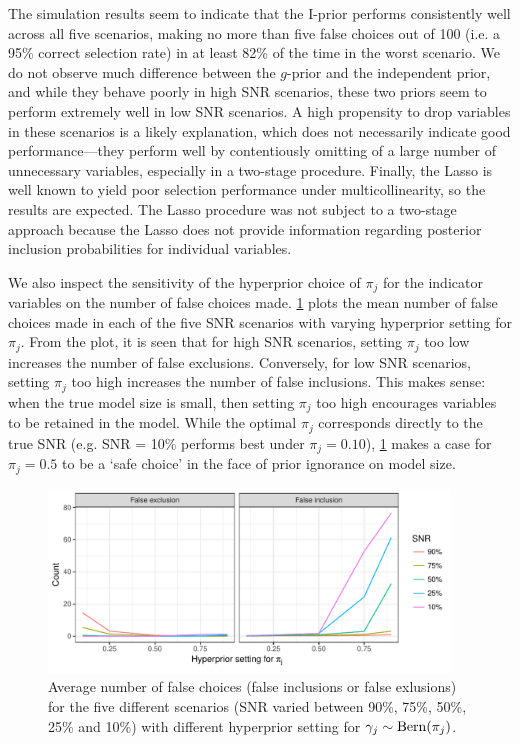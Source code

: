 \documentclass[showframe,11pt,twoside,openright]{report}
\begin{document}
The simulation results seem to indicate that the I-prior performs consistently well across all five scenarios, making no more than five false choices out of 100 (i.e. a 95\% correct selection rate) in at least 82\% of the time in the worst scenario.
We do not observe much difference between the $g$-prior and the independent prior, and while they behave poorly in high SNR scenarios, these two priors seem to perform extremely well in low SNR scenarios.
A high propensity to drop variables in these scenarios is a likely explanation, which does not necessarily indicate good performance---they perform well by contentiously omitting of a large number of unnecessary variables, especially in a two-stage procedure.
Finally, the Lasso is well known to yield poor selection performance under multicollinearity, so the results are expected.
The Lasso procedure was not subject to a two-stage approach because the Lasso does not provide information regarding posterior inclusion probabilities for individual variables.

We also inspect the sensitivity of the hyperprior choice of $\pi_j$ for the indicator variables on the number of false choices made.
\cref{fig:simres2} plots the mean number of false choices made in each of the five SNR scenarios with varying hyperprior setting for $\pi_j$.
From the plot, it is seen that for high SNR scenarios, setting $\pi_j$ too low increases the number of false exclusions.
Conversely, for low SNR scenarios, setting $\pi_j$ too high increases the number of false inclusions.
This makes sense: when the true model size is small, then setting $\pi_j$ too high encourages variables to be retained in the model.
While the optimal $\pi_j$ corresponds directly to the true SNR (e.g. SNR = 10\% performs best under $\pi_j=0.10$), \cref{fig:simres2} makes a case for $\pi_j=0.5$ to be a `safe choice' in the face of prior ignorance on model size.

\begin{figure}[hbt]
  \centering
  \includegraphics[width=0.95\textwidth]{figure/06-sens_analysis}
  \caption[Sensitivity analysis of hyperprior choice on number of false choices]{Average number of false choices (false inclusions or false exlusions) for the five different scenarios (SNR varied between 90\%, 75\%, 50\%, 25\% and 10\%) with different hyperprior setting for $\gamma_j\sim\operatorname{Bern}(\pi_j)$.}
  \label{fig:simres2}
\end{figure}
\vspace{-1em}
\end{document}
